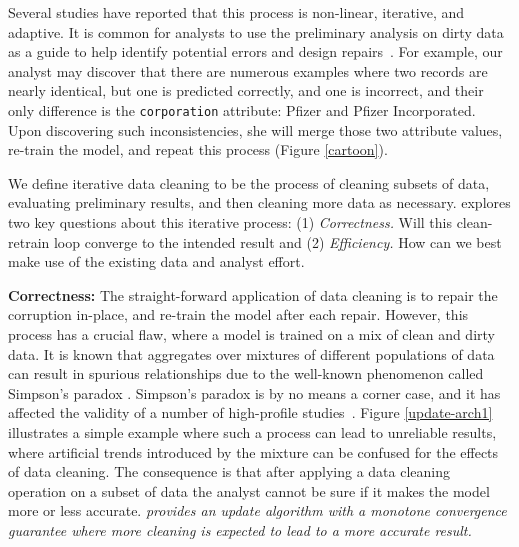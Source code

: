 Several studies have reported that this process is non-linear, iterative, and adaptive.
It is common for analysts to use the preliminary analysis on dirty data as a guide to help identify potential errors and design repairs~\cite{kandel2012}.
For example, our analyst may discover that there are numerous examples where two records are nearly identical, but one is predicted correctly, and one is incorrect, and their only difference is the \texttt{corporation} attribute: Pfizer and Pfizer Incorporated.
Upon discovering such inconsistencies, she will merge those two attribute values, re-train the model, and repeat this process (Figure \ref{cartoon}).

We define iterative data cleaning to be the process of cleaning subsets of data, evaluating preliminary results, and then cleaning more data as necessary.
\sys explores two key questions about this iterative process: (1) \emph{Correctness.} Will this clean-retrain loop converge to the intended result and (2) \emph{Efficiency.} How can we best make use of the existing data and analyst effort.

\vspace{0.5em}
\noindent \textbf{Correctness: } The straight-forward application of data cleaning is to repair the corruption in-place, and re-train the model after each repair.
However, this process has a crucial flaw, where a model is trained on a mix of clean and dirty data.
It is known that aggregates over mixtures of different populations of data can result in spurious relationships due to the well-known phenomenon called Simpson's paradox \cite{simpson1951interpretation}.
Simpson's paradox is by no means a corner case, and it has affected the validity of a number of high-profile studies~\cite{pearl2003causality}.
Figure \ref{update-arch1} illustrates a simple example where such a process can lead to unreliable results, where artificial trends introduced by the mixture can be confused for the effects of data cleaning.
The consequence is that after applying a data cleaning operation on a subset of data the analyst cannot be sure if it makes the model more or less accurate.
\emph{\sys provides an update algorithm with a monotone convergence guarantee where more cleaning is expected to lead to a more accurate result.}

